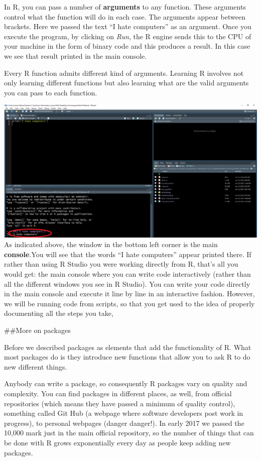 \documentclass[]{book}
\theoremstyle{definition}
\theoremstyle{definition}
\theoremstyle{definition}
\theoremstyle{remark}
\begin{document}
In R, you can pass a number of \textbf{arguments} to any function. These
arguments control what the function will do in each case. The arguments
appear between brackets. Here we passed the text ``I hate computers'' as
an argument. Once you execute the program, by clicking on \emph{Run},
the R engine sends this to the CPU of your machine in the form of binary
code and this produces a result. In this case we see that result printed
in the main console.

Every R function admits different kind of arguments. Learning R involves
not only learning different functions but also learning what are the
valid arguments you can pass to each function.

\includegraphics{imgs/consoleresults.png} As indicated above, the window
in the bottom left corner is the main \textbf{console}.You will see that
the words ``I hate computers'' appear printed there. If rather than
using R Studio you were working directly from R, that's all you would
get: the main console where you can write code interactively (rather
than all the different windows you see in R Studio). You can write your
code directly in the main console and execute it line by line in an
interactive fashion. However, we will be running code from scripts, so
that you get used to the idea of properly documenting all the steps you
take,

\#\#More on packages

Before we described packages as elements that add the functionality of
R. What most packages do is they introduce new functions that allow you
to ask R to do new different things.

Anybody can write a package, so consequently R packages vary on quality
and complexity. You can find packages in different places, as well, from
official repositories (which means they have passed a minimum of quality
control), something called Git Hub (a webpage where software developers
post work in progress), to personal webpages (danger danger!). In early
2017 we passed the 10,000 mark just in the main official repository, so
the number of things that can be done with R grows exponentially every
day as people keep adding new packages.
\end{document}
